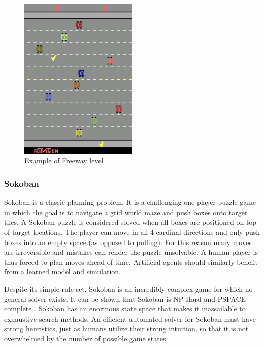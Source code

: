 \begin{figure}[H]
\includegraphics[width=0.5\textwidth,keepaspectratio]{figures/Freeway.png}
\caption[Freeway]{Example of Freeway level}
\label{Fig.Freeway}
\end{figure}


\subsubsection{Sokoban}

Sokoban is a classic planning problem. It is a challenging one-player puzzle game in which the goal is to navigate a grid world maze and push boxes onto target tiles. A Sokoban puzzle is considered solved when all boxes are positioned on top of target locations. The player can move in all 4 cardinal directions and only push boxes into an empty space (as opposed to pulling). For this reason many moves are irreversible and mistakes can render the puzzle unsolvable. A human player is thus forced to plan moves ahead of time. Artificial agents should similarly benefit from a learned model and simulation.

Despite its simple rule set, Sokoban is an incredibly complex game for which no general solver exists. It can be shown that Sokoban is NP-Hard and PSPACE-complete \cite{Benchmark.Sokoban}. Sokoban has an enormous state space that makes it inassailable to exhaustive search methods. An efficient automated solver for Sokoban must have strong heuristics, just as humans utilize their strong intuition, so that it is not overwhelmed by the number of possible game states.

